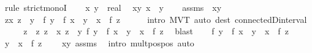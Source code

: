 \begin{isabellebody}
%
\isadelimproof
%
\endisadelimproof
%
\isatagproof
{}\isamarkupfalse%
\ {\isacharparenleft}{\kern0pt}rule\ strict{\isacharunderscore}{\kern0pt}monoI{\isacharparenright}{\kern0pt}\isanewline
\ \ \isamarkupfalse%
\ x\ y\ {\isacharcolon}{\kern0pt}{\isacharcolon}{\kern0pt}\ real\ \isamarkupfalse%
\ xy{\isacharcolon}{\kern0pt}\ {\isachardoublequoteopen}x\ {\isacharless}{\kern0pt}\ y{\isachardoublequoteclose}\isanewline
\ \ \isamarkupfalse%
\ assms\ \ xy\ \isamarkupfalse%
\ {\isachardoublequoteopen}{\isasymexists}z{\isachargreater}{\kern0pt}x{\isachardot}{\kern0pt}\ z\ {\isacharless}{\kern0pt}\ y\ {\isasymand}\ f\ y\ {\isacharminus}{\kern0pt}\ f\ x\ {\isacharequal}{\kern0pt}\ {\isacharparenleft}{\kern0pt}y\ {\isacharminus}{\kern0pt}\ x{\isacharparenright}{\kern0pt}\ {\isacharasterisk}{\kern0pt}\ f{\isacharprime}{\kern0pt}\ z{\isachardoublequoteclose}\isanewline
\ \ \ \ \isamarkupfalse%
\ {\isacharparenleft}{\kern0pt}intro\ MVT{}{\isacharparenright}{\kern0pt}\ {\isacharparenleft}{\kern0pt}auto\ dest{\isacharcolon}{\kern0pt}\ connectedD{\isacharunderscore}{\kern0pt}interval{\isacharparenright}{\kern0pt}\isanewline
\ \ \isamarkupfalse%
\ \isamarkupfalse%
\ z\ \ z{\isacharcolon}{\kern0pt}\ {\isachardoublequoteopen}z\ {\isachargreater}{\kern0pt}\ x{\isachardoublequoteclose}\ {\isachardoublequoteopen}z\ {\isacharless}{\kern0pt}\ y{\isachardoublequoteclose}\ {\isachardoublequoteopen}f\ y\ {\isacharminus}{\kern0pt}\ f\ x\ {\isacharequal}{\kern0pt}\ {\isacharparenleft}{\kern0pt}y\ {\isacharminus}{\kern0pt}\ x{\isacharparenright}{\kern0pt}\ {\isacharasterisk}{\kern0pt}\ f{\isacharprime}{\kern0pt}\ z{\isachardoublequoteclose}\ \isamarkupfalse%
\ blast\isanewline
\ \ \isamarkupfalse%
\ {\isacartoucheopen}f\ y\ {\isacharminus}{\kern0pt}\ f\ x\ {\isacharequal}{\kern0pt}\ {\isacharparenleft}{\kern0pt}y\ {\isacharminus}{\kern0pt}\ x{\isacharparenright}{\kern0pt}\ {\isacharasterisk}{\kern0pt}\ f{\isacharprime}{\kern0pt}\ z{\isacartoucheclose}\isanewline
\ \ \isamarkupfalse%
\ \isamarkupfalse%
\ {\isachardoublequoteopen}{\isacharparenleft}{\kern0pt}y\ {\isacharminus}{\kern0pt}\ x{\isacharparenright}{\kern0pt}\ {\isacharasterisk}{\kern0pt}\ f{\isacharprime}{\kern0pt}\ z\ {\isachargreater}{\kern0pt}\ {}{\isachardoublequoteclose}\ \isamarkupfalse%
\ xy\ assms\ \isamarkupfalse%
\ {\isacharparenleft}{\kern0pt}intro\ mult{\isacharunderscore}{\kern0pt}pos{\isacharunderscore}{\kern0pt}pos{\isacharparenright}{\kern0pt}\ auto\isanewline

\end{isabellebody}
